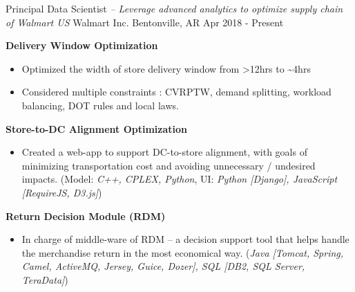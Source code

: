 

\begin{cventries}


\cventry
{Principal Data Scientist \textit{ -- Leverage advanced analytics to optimize supply chain of Walmart US}}          %
{Walmart Inc.}                      %
{Bentonville, AR}                   %
{Apr 2018 - Present}                    %
{
    \begin{cvitems}
    \item {
        \textbf{Delivery Window Optimization}  
        \begin{itemize}
            \item  Optimized the width of store delivery window from >12hrs to \textasciitilde4hrs
            \item  Considered multiple constraints : CVRPTW, demand splitting, workload balancing, DOT rules and local laws. 
        \end{itemize}           
    }
    \item {
        \textbf{Store-to-DC Alignment Optimization} 
        \begin{itemize}
            \item  Created a web-app to support DC-to-store alignment, with goals of minimizing transportation cost and avoiding unnecessary / undesired impacts. 
            (Model: \textit{C++, CPLEX, Python}, UI: \textit{Python [Django], JavaScript [RequireJS, D3.js]}) 
        \end{itemize}           
    }
    \item {
        \textbf{Return Decision Module (RDM)} 
        \begin{itemize}
            \item  In charge of middle-ware of RDM -- a decision support tool that helps handle the merchandise return in the most economical way. 
                   (\textit{Java [Tomcat, Spring, Camel, ActiveMQ, Jersey, Guice, Dozer], SQL [DB2, SQL Server, TeraData]})
        \end{itemize}           
    }
    \end{cvitems}%
}


\end{cventries}
